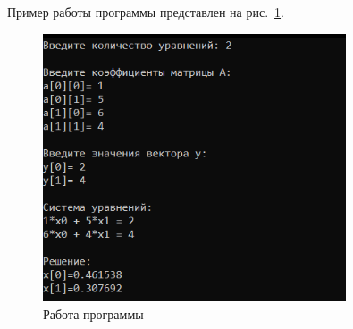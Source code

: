 \documentclass[12pt,a4paper]{scrartcl}
\begin{document}
Пример работы программы представлен на рис.~\ref{fig:par}.

\begin{figure}[h]
	\centering
	\includegraphics[width=0.8\textwidth]{output.png}
	\caption{Работа программы}\label{fig:par}
 
\end{figure}
\end{document}
